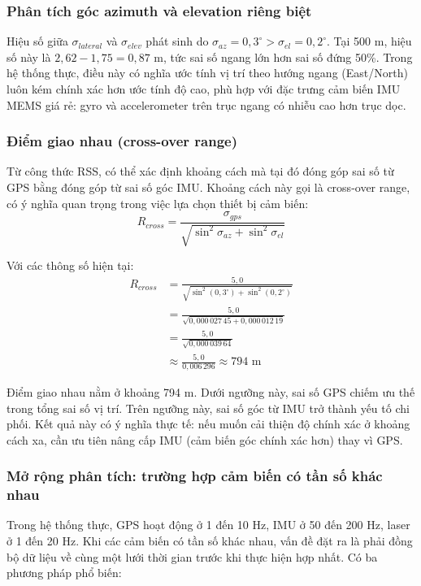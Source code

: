 \subsubsection{Phân tích góc azimuth và elevation riêng biệt}
\hspace{0.5cm} Hiệu số giữa $\sigma_{lateral}$ và $\sigma_{elev}$ phát sinh do $\sigma_{az} = 0{,}3^\circ > \sigma_{el} = 0{,}2^\circ$. Tại 500 m, hiệu số này là $2{,}62 - 1{,}75 = 0{,}87$ m, tức sai số ngang lớn hơn sai số đứng 50\%. Trong hệ thống thực, điều này có nghĩa ước tính vị trí theo hướng ngang (East/North) luôn kém chính xác hơn ước tính độ cao, phù hợp với đặc trưng cảm biến IMU MEMS giá rẻ: gyro và accelerometer trên trục ngang có nhiễu cao hơn trục dọc.

\subsubsection{Điểm giao nhau (cross-over range)}
\hspace{0.5cm} Từ công thức RSS, có thể xác định khoảng cách mà tại đó đóng góp sai số từ GPS bằng đóng góp từ sai số góc IMU. Khoảng cách này gọi là cross-over range, có ý nghĩa quan trọng trong việc lựa chọn thiết bị cảm biến:
\begin{equation}
    R_{cross} = \frac{\sigma_{gps}}{\sqrt{\sin^2\sigma_{az} + \sin^2\sigma_{el}}}
\end{equation}

Với các thông số hiện tại:
\begin{align*}
    R_{cross} &= \frac{5{,}0}{\sqrt{\sin^2(0{,}3^\circ) + \sin^2(0{,}2^\circ)}} \\
              &= \frac{5{,}0}{\sqrt{0{,}000\,027\,45 + 0{,}000\,012\,19}} \\
              &= \frac{5{,}0}{\sqrt{0{,}000\,039\,64}} \\
              &\approx \frac{5{,}0}{0{,}006\,296} \approx 794 \text{ m}
\end{align*}

Điểm giao nhau nằm ở khoảng 794 m. Dưới ngưỡng này, sai số GPS chiếm ưu thế trong tổng sai số vị trí. Trên ngưỡng này, sai số góc từ IMU trở thành yếu tố chi phối. Kết quả này có ý nghĩa thực tế: nếu muốn cải thiện độ chính xác ở khoảng cách xa, cần ưu tiên nâng cấp IMU (cảm biến góc chính xác hơn) thay vì GPS.

\subsubsection{Mở rộng phân tích: trường hợp cảm biến có tần số khác nhau}
\hspace{0.5cm} Trong hệ thống thực, GPS hoạt động ở 1 đến 10 Hz, IMU ở 50 đến 200 Hz, laser ở 1 đến 20 Hz. Khi các cảm biến có tần số khác nhau, vấn đề đặt ra là phải đồng bộ dữ liệu về cùng một lưới thời gian trước khi thực hiện hợp nhất. Có ba phương pháp phổ biến:

